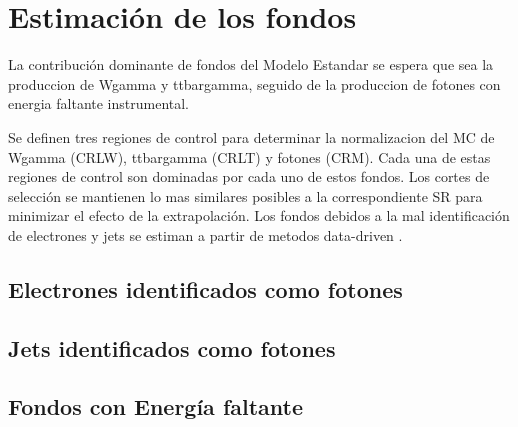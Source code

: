 \chapter{Estimaci\'on de los fondos}

La contribuci\'on dominante de fondos del Modelo Estandar se espera que sea la produccion de  Wgamma
 y ttbargamma, seguido de la produccion de fotones con energia faltante instrumental.

Se definen tres regiones de control para determinar la normalizacion del MC de Wgamma (CRLW),
ttbargamma (CRLT) y fotones (CRM). Cada una de estas regiones de control son dominadas por cada uno
de estos fondos.
Los cortes de selecci\'on se mantienen lo mas similares posibles a la correspondiente SR para
minimizar el efecto de la extrapolaci\'on. Los fondos debidos a la mal identificaci\'on de
electrones y jets se estiman a partir de metodos data-driven .

\section{Electrones identificados como fotones}

\section{Jets identificados como fotones}


\section{Fondos con Energ\'ia faltante}
